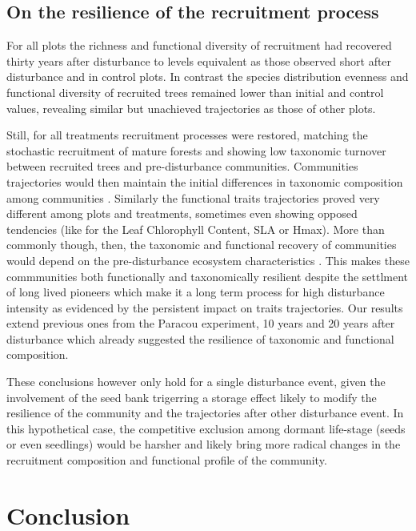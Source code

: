 \documentclass[fleqn,10pt]{ArtEcoFoG} %
\begin{document}
\subsection{On the resilience of the recruitment
process}\label{on-the-resilience-of-the-recruitment-process}

For all plots the richness and functional diversity of recruitment had
recovered thirty years after disturbance to levels equivalent as those
observed short after disturbance and in control plots. In contrast the
species distribution evenness and functional diversity of recruited
trees remained lower than initial and control values, revealing similar
but unachieved trajectories as those of other plots.

Still, for all treatments recruitment processes were restored, matching
the stochastic recruitment of mature forests and showing low taxonomic
turnover between recruited trees and pre-disturbance communities.
Communities trajectories would then maintain the initial differences in
taxonomic composition among communities \citep{Fukami2005}. Similarly
the functional traits trajectories proved very different among plots and
treatments, sometimes even showing opposed tendencies (like for the Leaf
Chlorophyll Content, SLA or Hmax). More than commonly though, then, the
taxonomic and functional recovery of communities would depend on the
pre-disturbance ecosystem characteristics
\citep{Anderson2007, Herault2018}. This makes these commmunities both
functionally and taxonomically resilient despite the settlment of long
lived pioneers which make it a long term process for high disturbance
intensity as evidenced by the persistent impact on traits trajectories.
Our results extend previous ones from the Paracou experiment, 10 years
\citep{Molino2001} and 20 years \citep{Baraloto2012a} after disturbance
which already suggested the resilience of taxonomic and functional
composition.

These conclusions however only hold for a single disturbance event,
given the involvement of the seed bank trigerring a storage effect
likely to modify the resilience of the community and the trajectories
after other disturbance event. In this hypothetical case, the
competitive exclusion among dormant life-stage (seeds or even seedlings)
would be harsher and likely bring more radical changes in the
recruitment composition and functional profile of the community.

\section{Conclusion}\label{conclusion}
\end{document}
